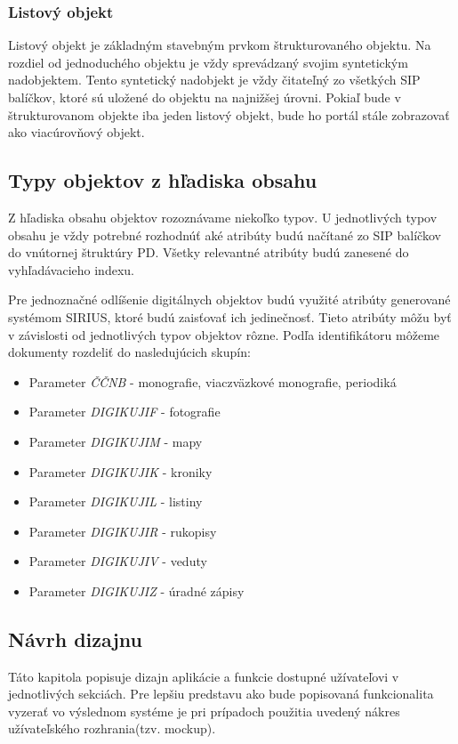 \documentclass[
  print, %
  table,   %
  lof,     %
  nolot,     %
]{fithesis3}
\begin{document}
\subsubsection{Listový objekt}	
Listový objekt je základným stavebným prvkom štrukturovaného objektu. Na rozdiel od jednoduchého objektu je vždy sprevádzaný svojim syntetickým nadobjektem. Tento syntetický nadobjekt je vždy čitateľný zo všetkých SIP balíčkov, ktoré sú uložené do objektu na najnižšej úrovni. Pokiaľ bude v štrukturovanom objekte iba jeden listový objekt, bude ho portál stále zobrazovať ako viacúrovňový objekt.
\subsection{Typy objektov z hľadiska obsahu}
Z hľadiska obsahu objektov rozoznávame niekoľko typov. U jednotlivých typov obsahu je vždy potrebné rozhodnúť aké atribúty budú načítané zo SIP balíčkov do vnútornej štruktúry PD. Všetky relevantné atribúty budú zanesené do vyhľadávacieho indexu.

Pre jednoznačné odlíšenie digitálnych objektov budú využité atribúty generované systémom SIRIUS, ktoré budú zaisťovať ich jedinečnosť. Tieto atribúty môžu byť v závislosti od jednotlivých typov objektov rôzne. Podľa identifikátoru môžeme dokumenty rozdeliť do nasledujúcich skupín:
\begin{itemize}
	\item Parameter \textit{ČČNB} - monografie, viaczväzkové monografie, periodiká
	\item Parameter \textit{DIGIKUJIF} - fotografie
	\item Parameter \textit{DIGIKUJIM} - mapy
	\item Parameter \textit{DIGIKUJIK} - kroniky
	\item Parameter \textit{DIGIKUJIL} - listiny
	\item Parameter \textit{DIGIKUJIR} - rukopisy
	\item Parameter	\textit{DIGIKUJIV} - veduty
	\item Parameter \textit{DIGIKUJIZ} - úradné zápisy
\end{itemize}
\subsection{Návrh dizajnu}
Táto kapitola popisuje dizajn aplikácie a funkcie dostupné užívateľovi v jednotlivých sekciách.	Pre lepšiu predstavu ako bude popisovaná funkcionalita vyzerať vo výslednom systéme je pri prípadoch použitia uvedený nákres užívateľského rozhrania(tzv. mockup).
\end{document}
